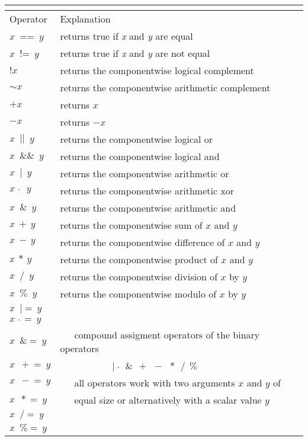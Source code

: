 \begin{tabular}{l|l}
\multicolumn{2}{c}{\hspace*{\columnwidth}\hspace*{-2\tabcolsep}\mbox{}}\\[-1.5ex]
\hline
Operator & Explanation \\
\hline
$x$~==~$y$ & returns true if {\em x\/} and {\em y} are equal\\
$x$~!=~$y$ & returns true if {\em x\/} and {\em y} are not equal\\
\hline
$!x$ & returns the componentwise logical complement\\
$\sim\!x$ & returns the componentwise arithmetic complement\\
$+x$ & returns $x$ \\
$-x$ & returns $-x$ \\
\hline
$x~\;||\;~y$ & returns the componentwise logical or\\
$x~\;\&\&\;~y$ & returns the componentwise logical and\\
$x~\;|\;~y$ & returns the componentwise arithmetic or\\
$x~\;\hat{~}\;~y$ & returns the componentwise arithmetic xor\\
$x~\;\&\;~y$ & returns the componentwise arithmetic and\\
$x~+~y$ & returns the componentwise sum of $x$ and $y$\\
$x~-~y$ & returns the componentwise difference of $x$ and $y$\\
$x~*~y$ & returns the componentwise product of $x$ and $y$\\
$x~\;/\;~y$ & returns the componentwise division of $x$ by $y$\\
$x~\;\%\;~y$ & returns the componentwise modulo of $x$ by $y$\\
\hline
$x~\;|\!=~y$ & \\
$x~\;\hat{~}\!=~y$ & \\
$x~\;\&\!=~y$ & \mbox{~~~}compound assigment operators of the binary operators\\
$x~\;+\!=~y$ & \mbox{~~~~~~~~~~~}$|~~\hat{~}~~\&~~+~~-~~*~~/~~\%$\\
$x~\;-\!=~y$ & \mbox{~~~}all operators work with two arguments $x$ and $y$ of\\
$x~\;*\!=~y$ & \mbox{~~~}equal size or alternatively with a scalar value $y$\\
$x~\;/\!=~y$ & \\
$x~\;\%\!=~y$ & \\

\end{tabular}
